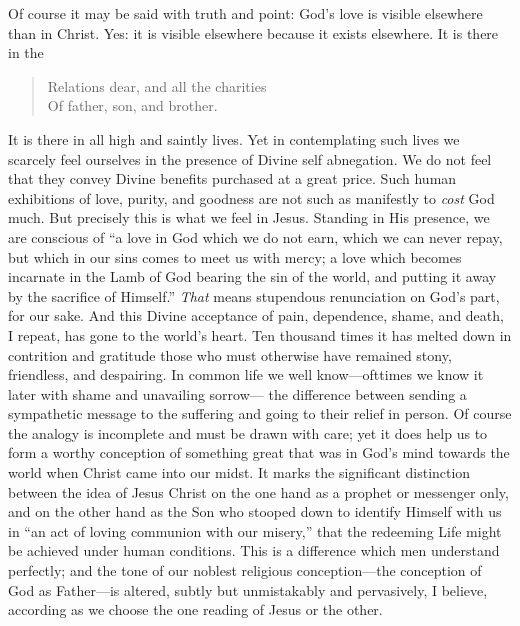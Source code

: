 \documentclass[12pt,a5paper,oneside]{book}
\begin{document}
Of course it may be said with truth and
point: God's love is visible elsewhere than
in Christ. Yes: it is visible elsewhere because
it exists elsewhere. It is there in the
\begin{verse}
\small
Relations dear, and all the charities\\
Of father, son, and brother.
\end{verse}
It is there in all high and saintly lives. Yet
in contemplating such lives we scarcely
feel ourselves in the presence of Divine self
abnegation. We do not feel that they convey
Divine benefits purchased at a great price.
Such human exhibitions of love, purity, and
goodness are not such as manifestly to \textit{cost} God
much. But precisely this is what we feel in
Jesus. Standing in His presence, we are conscious 
of ``a love in God which we do not
earn, which we can never repay, but which
in our sins comes to meet us with mercy; a
love which becomes incarnate in the Lamb of
God bearing the sin of the world, and putting
it away by the sacrifice of Himself.'' \textit{That}
means stupendous renunciation on God's part,
for our sake. And this Divine acceptance of
pain, dependence, shame, and death, I repeat,
has gone to the world's heart. Ten thousand
times it has melted down in contrition and
gratitude those who must otherwise have remained 
stony, friendless, and despairing. In
common life we well know---ofttimes we know
it later with shame and unavailing sorrow---
the difference between sending a sympathetic
message to the suffering and going to their
relief in person. Of course the analogy is
incomplete and must be drawn with care; yet
it does help us to form a worthy conception
of something great that was in God's mind
towards the world when Christ came into our
midst. It marks the significant distinction
between the idea of Jesus Christ on the one
hand as a prophet or messenger only, and on
the other hand as the Son who stooped down
to identify Himself with us in ``an act of
loving communion with our misery,'' that the
redeeming Life might be achieved under human
conditions. This is a difference which men
understand perfectly; and the tone of our
noblest religious conception---the conception
of God as Father---is altered, subtly but
unmistakably and pervasively, I believe, according 
as we choose the one reading of Jesus or
the other.
\end{document}
